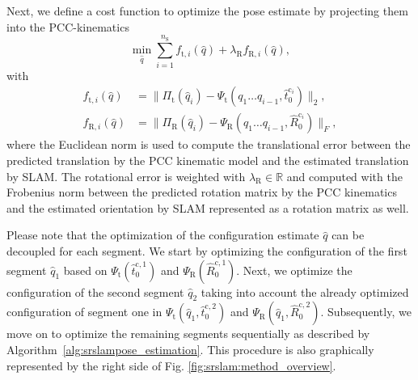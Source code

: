 Next, we define a cost function to optimize the pose estimate by projecting them into the \gls{PCC}-kinematics
%
\begin{equation}\label{eq:srslam:cost_fun}
    \min_{\hat{q}} \sum_{i=1}^{n_\mathrm{S}} f_{\mathrm{t},i}(\hat{q}) + \lambda_\mathrm{R} f_{\mathrm{R},i}(\hat{q}),
\end{equation}
with
\begin{equation}\label{eq:srslam:cost_fun_ingredients}
\begin{split}
    f_{\mathrm{t},i}(\hat{q}) &=
    \big\lVert 
    \Pi_\mathrm{t}(\hat{q}_i) - \Psi_\mathrm{t}(q_1 \dots q_{i-1}, \hat{t}_{0}^{\mathrm{c}_i})
    \big\rVert_2,\\
    f_{\mathrm{R},i}(\hat{q}) &=
    \big\lVert 
    \Pi_\mathrm{R}(\hat{q}_i) - \Psi_\mathrm{R}(q_1 \dots q_{i-1}, \hat{R}_{0}^{\mathrm{c}_i})
    \big\rVert_F,
\end{split}
\end{equation}
where the Euclidean norm is used to compute the translational error between the predicted translation by the \gls{PCC} kinematic model and the estimated translation by \gls{SLAM}. The rotational error is weighted with $\lambda_\mathrm{R} \in \mathbb{R}$ and computed with the Frobenius norm between the predicted rotation matrix by the \gls{PCC} kinematics and the estimated orientation by \gls{SLAM} represented as a rotation matrix as well.

Please note that the optimization of the configuration estimate $\hat{q}$ can be decoupled for each segment. 
We start by optimizing the configuration of the first segment $\hat{q}_1$ based on $\Psi_\mathrm{t}(\hat{t}_{0}^{\mathrm{c},1})$ and $\Psi_\mathrm{R}(\hat{R}_{0}^{\mathrm{c},1})$. Next, we optimize the configuration of the second segment $\hat{q}_2$ taking into account the already optimized configuration of segment one in $\Psi_\mathrm{t}(\hat{q}_1, \hat{t}_{0}^{\mathrm{c},2})$ and $\Psi_\mathrm{R}(\hat{q}_1, \hat{R}_{0}^{\mathrm{c},2})$. 
Subsequently, we move on to optimize the remaining segments sequentially as described by Algorithm~\ref{alg:srslampose_estimation}. This procedure is also graphically represented by the right side of Fig. \ref{fig:srslam:method_overview}.

